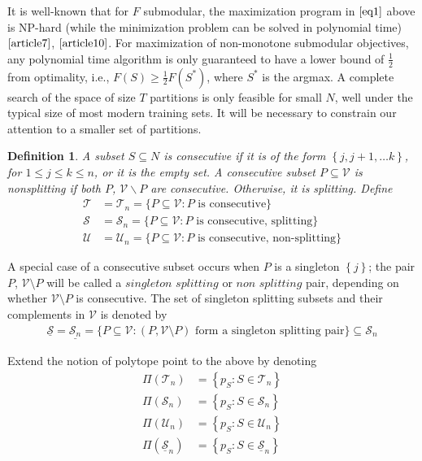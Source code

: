 \documentclass{article}
\newtheorem{definition}{Definition}
\theoremstyle{case}
\begin{document}
It is well-known that for $F$ submodular, the maximization program in $\ref{eq1}$ above is NP-hard (while the minimization problem can be solved in polynomial time) $\cite{article7}$, $\cite{article10}$. For maximization of non-monotone submodular objectives, any polynomial time algorithm is only guaranteed to have a lower bound of $\frac{1}{2}$ from optimality, i.e., $F(S) \geq \frac{1}{2}F(S^{*})$, where $S^*$ is the argmax. A complete search of the space of size $T$ partitions is only feasible for small $N$, well under the typical size of most modern training sets. It will be necessary to constrain our attention to a smaller set of partitions.

\begin{definition}
A subset $S \subseteq N$ is consecutive if it is of the form $\left\lbrace j, j+1, \dots k\right\rbrace$, for $1 \leq j \leq k \leq n$, or it is the empty set. A consecutive subset $P \subseteq \mathcal{V}$ is nonsplitting if both $P$, $\mathcal{V}  \backslash P$ are consecutive. Otherwise, it is splitting. Define
\begin{align*}
\mathcal{T} &= \mathcal{T}_n = \{ P \subseteq \mathcal{V} : P \textrm{ is consecutive} \}\\
\mathcal{S} &= \mathcal{S}_n = \{ P \subseteq \mathcal{V} : P \textrm{ is consecutive, splitting} \} \\
\mathcal{U} &= \mathcal{U}_n = \{ P \subseteq \mathcal{V} : P \textrm{ is consecutive, non-splitting}\}
\end{align*}
\end{definition}


A special case of a consecutive subset occurs when $P$ is a singleton $\left\lbrace j\right\rbrace$; the pair $P$, $\mathcal{V}\setminus P$ will be called a $\textit{singleton splitting}$ or $\textit{non splitting}$ pair, depending on whether $\mathcal{V}\setminus P$ is consecutive. The set of singleton splitting subsets and their complements in $\mathcal{V}$ is denoted by 
\begin{align*}
\mathcal{\underline{S}} = \underline{\mathcal{S}_n}  = \{ P \subseteq \mathcal{V} \colon (P, \mathcal{V} \setminus P) \textrm{ form a singleton splitting pair}\}\subseteq \mathcal{S}_n
\end{align*}

Extend the notion of polytope point to the above by denoting
\begin{align*}
\Pi\left( \mathcal{T}_n\right) &= \left\lbrace p_S \colon S \in \mathcal{T}_n\right\rbrace \\
\Pi\left( \mathcal{S}_n\right) &= \left\lbrace p_S \colon S \in \mathcal{S}_n\right\rbrace \\
\Pi\left( \mathcal{U}_n\right) &= \left\lbrace p_S \colon S \in \mathcal{U}_n\right\rbrace \\
\Pi\left( \underline{\mathcal{S}}_n\right) &= \left\lbrace p_S \colon S \in \underline{\mathcal{S}}_n\right\rbrace \\
\end{align*}
\end{document}
